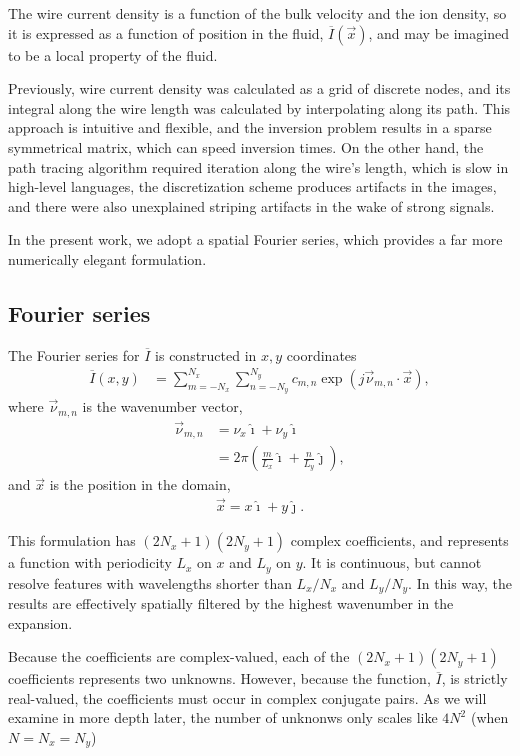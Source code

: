 \documentclass{article}
\def\I{\overline{I}}
\def\x{\vec{x}}
\def\vnu{\vec{\nu}_{m,n}}
\def\ui{\hat{\imath}}
\def\uj{\hat{\jmath}}
\begin{document}
The wire current density is a function of the bulk velocity and the ion density, so it is expressed as a function of position in the fluid, $\I(\x)$, and may be imagined to be a local property of the fluid. 

Previously, wire current density was calculated as a grid of discrete nodes, and its integral along the wire length was calculated by interpolating along its path.  This approach is intuitive and flexible, and the inversion problem results in a sparse symmetrical matrix, which can speed inversion times.  On the other hand, the path tracing algorithm required iteration along the wire's length, which is slow in high-level languages, the discretization scheme produces artifacts in the images, and there were also unexplained striping artifacts in the wake of strong signals.

In the present work, we adopt a spatial Fourier series, which provides a far more numerically elegant formulation.

\subsection{Fourier series}

The Fourier series for $\I$ is constructed in $x,y$ coordinates
\begin{align}
\I(x,y) &= \sum_{m=-N_x}^{N_x} \sum_{n=-N_y}^{N_y} c_{m,n} \exp\left(j \vnu \cdot \x \right),\label{eqn:Ibar}
\end{align}
where $\vnu$ is the wavenumber vector,
\begin{align}
\vnu &= \nu_x \ui + \nu_y \ui\nonumber\\
 &=2\pi \left( \frac{m}{L_x} \ui + \frac{n}{L_y} \uj \right),
\end{align}
and $\x$ is the position in the domain,
\begin{align}
\x = x \ui + y \uj.
\end{align}

This formulation has $(2N_x+1)(2N_y+1)$ complex coefficients, and represents a function with periodicity $L_x$ on $x$ and $L_y$ on $y$.  It is continuous, but cannot resolve features with wavelengths shorter than $L_x / N_x$ and $L_y / N_y$.  In this way, the results are effectively spatially filtered by the highest wavenumber in the expansion.

Because the coefficients are complex-valued, each of the $(2N_x+1)(2N_y+1)$ coefficients represents two unknowns.  However, because the function, $\I$, is strictly real-valued, the coefficients must occur in complex conjugate pairs.  As we will examine in more depth later, the number of unknonws only scales like $4N^2$ (when $N = N_x = N_y$)
\end{document}
